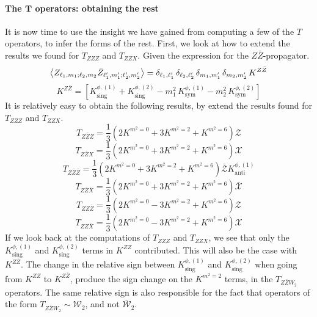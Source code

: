 \paragraph[The $T$ operators: obtaining the rest]{The $\mathbf{T}$ operators: obtaining the rest}
It is now time to use the insight we have gained from computing a few of the $T$ operators, to infer the forms of the rest. First, we look at how to extend the results we found for $T_{ZZZ}$ and $T_{ZZX}$. Given the expression for the $Z \bar{Z}$-propagator.
%
%
\begin{equation}
\expval{
Z_{\ell_1,m_1;\ell_2,m_2}
\bar{Z}_{\ell_1',m_1';\ell_2',m_2'}
}
=
\delta_{\ell_1,\ell_1'} \, \delta_{\ell_2,\ell_2'} \,
\delta_{m_1,m_1'} \, \delta_{m_2,m_2'} \, K^{Z\bar{Z}}
\end{equation}
%
%
\begin{equation}
K^{Z\bar{Z}} =
\left[
K^{\phi,(1)}_{\mathrm{sing}} + K^{\phi,(2)}_{\mathrm{sing}}
- m_1^2 \, K^{\phi,(1)}_{\mathrm{sym}}
- m_2^2 \, K^{\phi,(2)}_{\mathrm{sym}}
\right]
\end{equation}
%
%
It is relatively easy to obtain the following results, by extend the results found for $T_{ZZZ}$ and $T_{ZZX}$.
%
%
\begin{equation}
T_{Z\bar{Z}Z} = \frac{1}{3}
\left(
2 K^{m^2 = 0}
+ 3 K^{m^2 = 2}
+ K^{m^2 = 6}
\right)
\mathcal{Z}
\end{equation}
%
%
\begin{equation}
T_{Z\bar{Z}X} =  \frac{1}{3}
\left(
2 K^{m^2 = 0}
+ 3 K^{m^2 = 2}
+ K^{m^2 = 6}
\right)
\mathcal{X}
\end{equation}
%
%
\begin{equation}
T_{Z\bar{Z}\bar{Z}} = \frac{1}{3}
\left(
2 K^{m^2 = 0}
+ 3 K^{m^2 = 2}
+ K^{m^2 = 6}
\right)
\bar{\mathcal{Z}}K^{\phi,(1)}_{\mathrm{anti}}
\end{equation}
%
%
\begin{equation}
T_{Z\bar{Z}\bar{X}} =  \frac{1}{3}
\left(
2 K^{m^2 = 0}
+ 3 K^{m^2 = 2}
+ K^{m^2 = 6}
\right)
\bar{\mathcal{X}}
\end{equation}
%
%
\begin{equation}
T_{ZZ\bar{Z}} = \frac{1}{3}
\left(
2 K^{m^2 = 0}
- 3 K^{m^2 = 2}
+ K^{m^2 = 6}
\right)
\mathcal{Z}
\end{equation}
%
%
\begin{equation}
T_{ZZ\bar{X}} =  \frac{1}{3}
\left(
2 K^{m^2 = 0}
- 3 K^{m^2 = 2}
+ K^{m^2 = 6}
\right)
\mathcal{X}
\end{equation}
%
%
If we look back at the computations of $T_{ZZZ}$ and $T_{ZZX}$, we see that only the $K^{\phi,(1)}_{\mathrm{sing}}$ and $K^{\phi,(2)}_{\mathrm{sing}}$ terms in $K^{ZZ}$ contributed. This will also be the case with $K^{Z\bar{Z}}$. The change in the relative sign between $K^{\phi,(1)}_{\mathrm{sing}}$ and $K^{\phi,(2)}_{\mathrm{sing}}$ when going from $K^{ZZ}$ to $K^{Z\bar{Z}}$, produce the sign change on the $K^{m^2=2}$ terms, in the $T_{Z \bar{Z} W_2}$ operators. The same relative sign is also responsible for the fact that operators of the form $T_{Z \bar{Z} W_2} \sim \mathcal{W}_2$, and not $\mathcal{\bar{W}}_2$.\\
